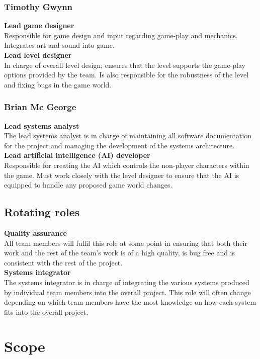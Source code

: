 \documentclass[a4paper,10pt]{article}
\begin{document}
\subsubsection{Timothy Gwynn}
\textbf{Lead game designer}\\
Responsible for game design and input regarding game-play and mechanics. Integrates art and sound into game.
\smallskip\\
\textbf{Lead level designer}\\
In charge of overall level design; ensures that the level supports the game-play options provided by the team. Is also responsible for the robustness of the level and fixing bugs in the game world.

\subsubsection{Brian Mc George}
\textbf{Lead systems analyst}\\
The lead systems analyst is in charge of maintaining all software documentation for the project and managing the development of the systems architecture.
\smallskip\\
\textbf{Lead artificial intelligence (AI) developer}\\
Responsible for creating the AI which controls the non-player characters within the game. Must work closely with the level designer to ensure that the AI is equipped to handle any proposed game world changes.

\subsection{Rotating roles}
\textbf{Quality assurance}\\
All team members will fulfil this role at some point in ensuring that both their work and the rest of the team's work is of a high quality, is bug free and is consistent with the rest of the project.
\smallskip\\
\textbf{Systems integrator}\\
The systems integrator is in charge of integrating the various systems produced by individual team members into the overall project. This role will often change depending on which team members have the most knowledge on how each system fits into the overall project.

\section{Scope}
\end{document}
